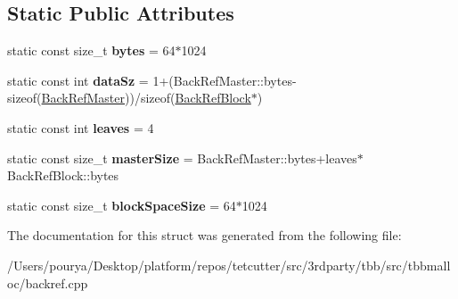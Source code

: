 \subsection*{Static Public Attributes}
\begin{DoxyCompactItemize}
\item 
\hypertarget{structrml_1_1internal_1_1BackRefMaster_ae3ed89c63a09f14c403ceb935c6da3b2}{}static const size\+\_\+t {\bfseries bytes} = 64$\ast$1024\label{structrml_1_1internal_1_1BackRefMaster_ae3ed89c63a09f14c403ceb935c6da3b2}

\item 
\hypertarget{structrml_1_1internal_1_1BackRefMaster_a1484fb5a1e861f14992095948b4664d7}{}static const int {\bfseries data\+Sz} = 1+(Back\+Ref\+Master\+::bytes-\/sizeof(\hyperlink{structrml_1_1internal_1_1BackRefMaster}{Back\+Ref\+Master}))/sizeof(\hyperlink{structrml_1_1internal_1_1BackRefBlock}{Back\+Ref\+Block}$\ast$)\label{structrml_1_1internal_1_1BackRefMaster_a1484fb5a1e861f14992095948b4664d7}

\item 
\hypertarget{structrml_1_1internal_1_1BackRefMaster_a32e7eaa4675dec7919b8d677ce6fe87f}{}static const int {\bfseries leaves} = 4\label{structrml_1_1internal_1_1BackRefMaster_a32e7eaa4675dec7919b8d677ce6fe87f}

\item 
\hypertarget{structrml_1_1internal_1_1BackRefMaster_aa1b53cdcefd14c8ab0602338c16b5d7a}{}static const size\+\_\+t {\bfseries master\+Size} = Back\+Ref\+Master\+::bytes+leaves$\ast$Back\+Ref\+Block\+::bytes\label{structrml_1_1internal_1_1BackRefMaster_aa1b53cdcefd14c8ab0602338c16b5d7a}

\item 
\hypertarget{structrml_1_1internal_1_1BackRefMaster_ab5554c421d8ac4681fa4b4dfb648fae2}{}static const size\+\_\+t {\bfseries block\+Space\+Size} = 64$\ast$1024\label{structrml_1_1internal_1_1BackRefMaster_ab5554c421d8ac4681fa4b4dfb648fae2}

\end{DoxyCompactItemize}


The documentation for this struct was generated from the following file\+:\begin{DoxyCompactItemize}
\item 
/\+Users/pourya/\+Desktop/platform/repos/tetcutter/src/3rdparty/tbb/src/tbbmalloc/backref.\+cpp\end{DoxyCompactItemize}
